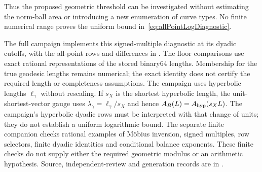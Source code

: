 Thus the proposed geometric threshold can be investigated without
estimating the norm-ball area or introducing a new enumeration of
curve types. No finite numerical range proves the uniform bound
in~\eqref{eq:allPointLogDiagnostic}.

The full campaign  implements
this signed-multiple diagnostic at its dyadic cutoffs, with the all-point
rows and differences in .
The floor comparisons use exact rational representations of the stored
binary64 lengths. Membership for the true geodesic lengths remains
numerical; the exact identity does not certify the required length or
completeness assumptions. The campaign uses hyperbolic lengths
$\ell_\gamma$ without rescaling. If
$s_X$ is the shortest hyperbolic length, the unit-shortest-vector gauge
uses $\lambda_\gamma=\ell_\gamma/s_X$ and hence
$A_B(L)=A_{\rm hyp}(s_XL)$. The campaign's hyperbolic dyadic rows must
be interpreted with that change of units; they do not establish a
uniform logarithmic bound. The separate finite companion
 checks rational examples of
M\"obius inversion, signed multiples, row selectors, finite dyadic
identities and conditional balance exponents. These finite checks do
not supply either the required geometric modulus or an arithmetic
hypothesis. Source, independent-review and generation records are in
.

